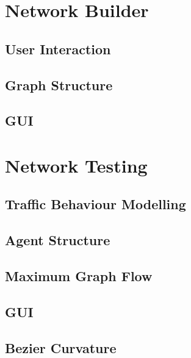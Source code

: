 \section{Network Builder}

    \subsection{User Interaction}

    \subsection{Graph Structure}

    \subsection{GUI}

\section{Network Testing}

    \subsection{Traffic Behaviour Modelling}

    \subsection{Agent Structure}

    \subsection{Maximum Graph Flow}

    \subsection{GUI}

    \subsection{Bezier Curvature}
